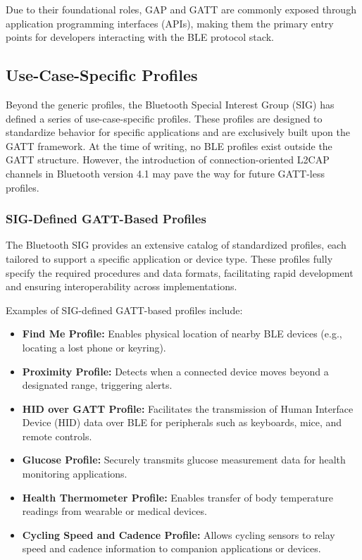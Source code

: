 Due to their foundational roles, GAP and GATT are commonly exposed through application programming interfaces (APIs), making them the primary entry points for developers interacting with the BLE protocol stack.

\subsection{Use-Case-Specific Profiles}

Beyond the generic profiles, the Bluetooth Special Interest Group (SIG) has defined a series of use-case-specific profiles. These profiles are designed to standardize behavior for specific applications and are exclusively built upon the GATT framework. At the time of writing, no BLE profiles exist outside the GATT structure. However, the introduction of connection-oriented L2CAP channels in Bluetooth version 4.1 may pave the way for future GATT-less profiles.

\subsubsection{SIG-Defined GATT-Based Profiles}

The Bluetooth SIG provides an extensive catalog of standardized profiles, each tailored to support a specific application or device type. These profiles fully specify the required procedures and data formats, facilitating rapid development and ensuring interoperability across implementations.

Examples of SIG-defined GATT-based profiles include:

\begin{itemize}
    \item \textbf{Find Me Profile:} Enables physical location of nearby BLE devices (e.g., locating a lost phone or keyring).
    \item \textbf{Proximity Profile:} Detects when a connected device moves beyond a designated range, triggering alerts.
    \item \textbf{HID over GATT Profile:} Facilitates the transmission of Human Interface Device (HID) data over BLE for peripherals such as keyboards, mice, and remote controls.
    \item \textbf{Glucose Profile:} Securely transmits glucose measurement data for health monitoring applications.
    \item \textbf{Health Thermometer Profile:} Enables transfer of body temperature readings from wearable or medical devices.
    \item \textbf{Cycling Speed and Cadence Profile:} Allows cycling sensors to relay speed and cadence information to companion applications or devices.
\end{itemize}

